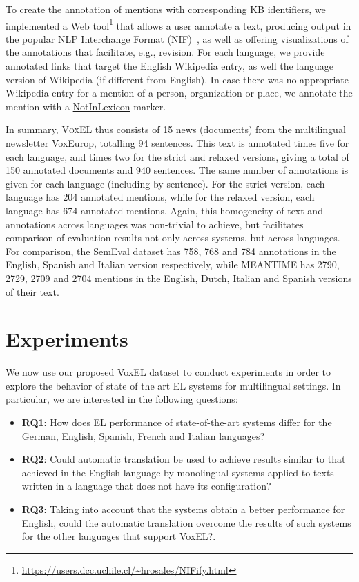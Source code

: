 \documentclass{llncs}
\begin{document}
To create the annotation of mentions with corresponding KB identifiers, we implemented a Web tool\footnote{\url{https://users.dcc.uchile.cl/~hrosales/NIFify.html}} that allows a user annotate a text, producing output in the popular NLP Interchange Format (NIF)~\cite{nif2013}, as well as offering visualizations of the annotations that facilitate, e.g., revision. For each language, we provide annotated links that target the English Wikipedia entry, as well the language version of Wikipedia (if different from English). In case there was no appropriate Wikipedia entry for a mention of a person, organization or place, we annotate the mention with a \url{NotInLexicon} marker.

In summary, \textsc{VoxEL} thus consists of 15 news (documents) from the multilingual newsletter VoxEurop, totalling 94 sentences. This text is annotated times five for each language, and times two for the strict and relaxed versions, giving a total of 150 annotated documents and 940 sentences. The same number of annotations is given for each language (including by sentence). For the strict version, each language has 204 annotated mentions, while for the relaxed version, each language has 674 annotated mentions. Again, this homogeneity of text and annotations across languages was non-trivial to achieve, but facilitates comparison of evaluation results not only across systems, but across languages. For comparison, the SemEval dataset has 758, 768 and 784 annotations in the English, Spanish and Italian version respectively, while MEANTIME has 2790, 2729, 2709 and 2704 mentions in the English, Dutch, Italian and Spanish versions of their text.

\section{Experiments}\label{sec:exp}

We now use our proposed VoxEL dataset to conduct experiments in order to explore the behavior of state of the art EL systems for multilingual settings. In particular, we are interested in the following questions:

\begin{itemize}
\item \textbf{RQ1}: How does EL performance of state-of-the-art systems differ for the German, English, Spanish, French and Italian languages? 
\item \textbf{RQ2}: Could automatic translation be used to achieve results similar to that achieved in the English language by monolingual systems applied to texts written in a language that does not have its configuration?
\item \textbf{RQ3}: Taking into account that the systems obtain a better performance for English, could the automatic translation overcome the results of such systems for the other languages that support VoxEL?.
\end{itemize}
\end{document}
